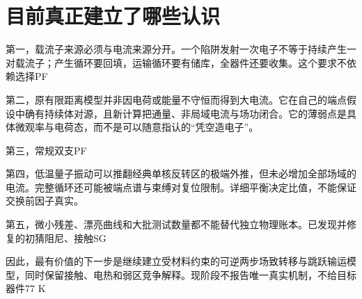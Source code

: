 \section{{\cjkfont 目前真正建立了哪些认识}\allowbreak{}}\label{sec:58}
{\cjkfont 第一，载流子来源必须与电流来源分开。一个陷阱发射一次电子不等于持续产生一对载流子；产生循环要回填，运输循环要有储库，全器件还要收集。这个要求不依赖选择}\allowbreak{}PF\allowbreak{}
\par
{\cjkfont 第二，原有限距离模型并非因电荷或能量不守恒而得到大电流。它在自己的端点假设中确有持续体对源，且新计算把通量、非局域电流与场功闭合。它的薄弱点是具体微观率与电荷态，而不是可以随意指认的“凭空造电子”。}\allowbreak{}
\par
{\cjkfont 第三，常规双支}\allowbreak{}PF\allowbreak{}
\par
{\cjkfont 第四，低温量子振动可以推翻经典单核反转区的极端外推，但未必增加全部场域的电流。完整循环还可能被端点谱与束缚对复位限制。详细平衡决定比值，不能保证交换前因子真实。}\allowbreak{}
\par
{\cjkfont 第五，微小残差、漂亮曲线和大批测试数量都不能替代独立物理账本。已发现并修复的初猜阻尼、接触}\allowbreak{}SG\allowbreak{}
\par
{\cjkfont 因此，最有价值的下一步是继续建立受材料约束的可逆两步场致转移与跳跃输运模型，同时保留接触、电热和弱区竞争解释。现阶段不报告唯一真实机制，不给目标器件}\allowbreak{}77 K\allowbreak{}
\par
{}
\medskip
\clearpage

